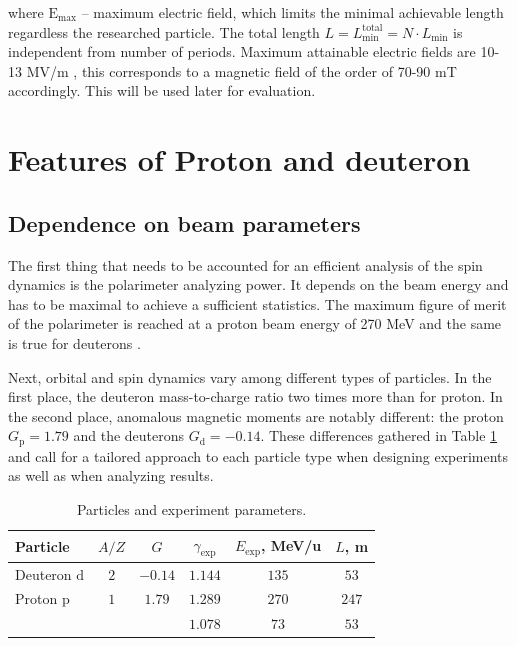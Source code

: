 \documentclass[submitting]{nst}
\begin{document}
\noindent where $\mathrm{E}_{\text{max}}$ -- maximum electric field, which limits the minimal achievable length regardless the researched particle. The total length $L=L_{\text{min}}^{\text{total}} = N\cdot L_{\text{min}}$ is independent from number of periods. Maximum attainable electric fields are 10-13 MV/m \cite{wien}, this corresponds to a magnetic field of the order of 70-90 mT accordingly. This will be used later for evaluation.

\section{Features of Proton and deuteron}\label{sec.III}

\subsection{Dependence on beam parameters}

\par The first thing that needs to be accounted for an efficient analysis of the spin dynamics is the polarimeter analyzing power. It depends on the beam energy and has to be maximal to achieve a sufficient statistics. The maximum figure of merit of the polarimeter is reached at a proton beam energy of 270  MeV \cite{Pol} and the same is true for deuterons \cite{Pol_d}. 

\par Next, orbital and spin dynamics vary among different types of particles. In the first place, the deuteron mass-to-charge ratio two times more than for proton. In the second place, anomalous magnetic moments are notably different: the proton $G_{\text{p}} = 1.79$ and the deuterons $G_{\text{d}} = -0.14$. These differences gathered in Table \ref{tab:particles} and call for a tailored approach to each particle type when designing experiments as well as when analyzing results.

\begin{table}[!htb]
	\caption{Particles and experiment parameters.}
	\label{tab:particles}
	\begin{tabular*}{8cm} {@{\extracolsep{\fill} } lccccc}
		\toprule
		Particle & $A/Z$ & $G$     & $\gamma_{\text{exp}}$ & $E_{\text{exp}}$, MeV/u & $L$, m \\
		\midrule
		Deuteron $\text{d}$ & $2$   & $-0.14$ & $1.144$  & $135$ & $53$ \\
		Proton $\text{p}$ & $1$   & $1.79$  & $1.289$ & $270$ & $247$ \\
		&    &   & $1.078$ & $73$ & $53$ \\
		\bottomrule
	\end{tabular*}
\end{table}
\end{document}
